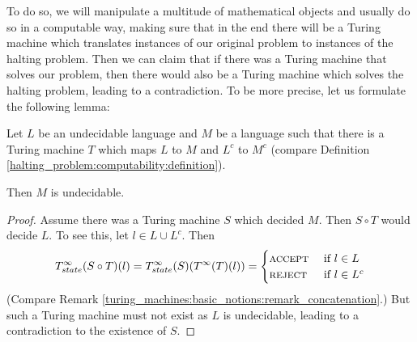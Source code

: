 To do so, we will manipulate a multitude of mathematical objects and usually do so in a computable way, making sure that in the end there will be a Turing machine which translates instances of our original problem to instances of the halting problem.
Then we can claim that if there was a Turing machine that solves our problem, then there would also be a Turing machine which solves the halting problem, leading to a contradiction.
To be more precise, let us formulate the following lemma:

\begin{Lemma}
	\label{halting_problem:computability:lemma_decidability}
	Let $L$ be an undecidable language
	and $M$ be a language such that there is a Turing machine $T$ which maps $L$ to $M$ and $L^c$ to $M^c$ (compare Definition \ref{halting_problem:computability:definition}).

	Then $M$ is undecidable.
\end{Lemma}
\begin{proof}
	Assume there was a Turing machine $S$ which decided $M$.
	Then $S \circ T$ would decide $L$.
	To see this, let $l \in L \cup L^c$. Then 
	\begin{align*}
		T_{state}^\infty(S \circ T)(l) = T_{state}^\infty(S) (T^\infty(T)(l)) = \begin{cases} \text{\scshape{accept}} &~\text{if}~ l \in L \\ \text{\scshape{reject}} &~\text{if}~ l \in L^c\end{cases}
	\end{align*}
	(Compare Remark \ref{turing_machines:basic_notions:remark_concatenation}.)
	But such a Turing machine must not exist as $L$ is undecidable, leading to a contradiction to the existence of $S$.
\end{proof}

